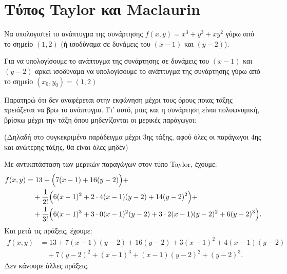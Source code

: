 \section{Τύπος Taylor και Maclaurin}

\begin{example}
  Να υπολογιστεί το ανάπτυγμα της συνάρτησης $f(x,y)=x^3+y^3+xy^2$ γύρω από το 
  σημείο $ (1,2) $ (ή ισοδύναμα σε δυνάμεις του $(x-1)$ και $(y-2)$).
\end{example}
\begin{solution}
  Για να υπολογίσουμε το ανάπτυγμα της συνάρτησης σε δυνάμεις του $(x-1)$ και $(y-2)$ 
  αρκεί ισοδύναμα να υπολογίσουμε το ανάπτυγμα της συνάρτησης γύρω από το 
  σημείο $(x_0,y_0)=(1,2)$

  Παρατηρώ ότι δεν αναφέρεται στην εκφώνηση μέχρι τους όρους ποιας τάξης 
  xρειάζεται να βρω το ανάπτυγμα.  Γι' αυτό, μιας και η συνάρτηση είναι πολυωνυμική,
  βρίσκω μέχρι την τάξη όπου μηδενίζονται οι μερικές παράγωγοι: 

  (Δηλαδή στο συγκεκριμένο παράδειγμα μέχρι $3$ης τάξης, αφού όλες οι παράγωγοι 
  $4$ης και ανώτερης τάξης, θα είναι όλες μηδέν)

  \vspace{\baselineskip}


  \vspace{\baselineskip}

  Με αντικατάσταση των μερικών παραγώγων στον τύπο Taylor, έχουμε:
  \begin{align*}
    f(x,y)&=13+\Bigl(7(x-1)+16(y-2)\Bigr)+ \\ 
          &\quad +\frac{1}{2!}\Bigl(6(x-1)^2 +2\cdot 4(x-1)(y-2)+14(y-2)^2\Bigr)+ \\
          &\quad +\frac{1}{3!}\Bigl(6(x-1)^3+3\cdot 0(x-1)^2(y-2)+3
          \cdot 2(x-1)(y-2)^2+6(y-2)^3\Bigr).
  \end{align*}
  Και μετά τις πράξεις, έχουμε: 
  \begin{align*}
    f(x,y)&=13+7(x-1)(y-2)+16(y-2)+3(x-1)^2+4(x-1)(y-2) \\
          &\quad +7(y-2)^2+(x-1)^3+(x-1)(y-2)^2+(y-2)^3.
  \end{align*}
  Δεν κάνουμε άλλες πράξεις.


\end{solution}
